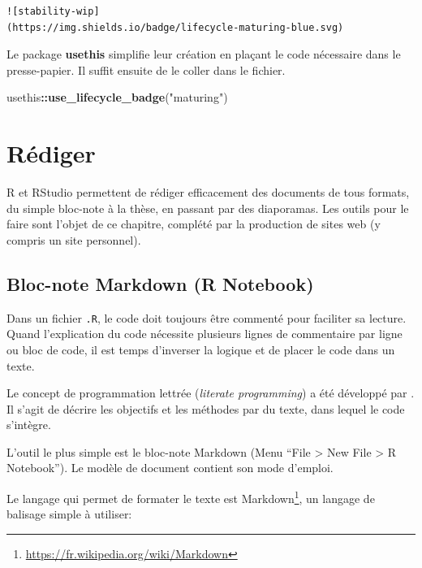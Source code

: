\documentclass[
  12pt,
  french,
  a4paper,
  extrafontsizes,onecolumn,openright
  ]{memoir}
\newenvironment{Shaded}{\begin{snugshade}}{\end{snugshade}}
\newcommand{\KeywordTok}[1]{\textcolor[rgb]{0.13,0.29,0.53}{\textbf{#1}}}
\newcommand{\NormalTok}[1]{#1}
\newcommand{\OperatorTok}[1]{\textcolor[rgb]{0.81,0.36,0.00}{\textbf{#1}}}
\newcommand{\StringTok}[1]{\textcolor[rgb]{0.31,0.60,0.02}{#1}}
\begin{document}
\begin{verbatim}
![stability-wip]
(https://img.shields.io/badge/lifecycle-maturing-blue.svg)
\end{verbatim}

Le package \textbf{usethis} simplifie leur création en plaçant le code nécessaire dans le presse-papier.
Il suffit ensuite de le coller dans le fichier.

\scriptsize

\begin{Shaded}
\begin{Highlighting}[]
\NormalTok{usethis}\OperatorTok{::}\KeywordTok{use_lifecycle_badge}\NormalTok{(}\StringTok{"maturing"}\NormalTok{)}
\end{Highlighting}
\end{Shaded}

\normalsize

\hypertarget{chap:rediger}{%
\chapter{Rédiger}\label{chap:rediger}}

R et RStudio permettent de rédiger efficacement des documents de tous formats, du simple bloc-note à la thèse, en passant par des diaporamas.
Les outils pour le faire sont l'objet de ce chapitre, complété par la production de sites web (y compris un site personnel).

\hypertarget{bloc-note-markdown-r-notebook}{%
\section{Bloc-note Markdown (R Notebook)}\label{bloc-note-markdown-r-notebook}}

Dans un fichier \texttt{.R}, le code doit toujours être commenté pour faciliter sa lecture.
Quand l'explication du code nécessite plusieurs lignes de commentaire par ligne ou bloc de code, il est temps d'inverser la logique et de placer le code dans un texte.

Le concept de programmation lettrée (\emph{literate programming}) a été développé par \textcite{Knuth1984}.
Il s'agit de décrire les objectifs et les méthodes par du texte, dans lequel le code s'intègre.

L'outil le plus simple est le bloc-note Markdown (Menu \enquote{File \textgreater{} New File \textgreater{} R Notebook}).
Le modèle de document contient son mode d'emploi.

Le langage qui permet de formater le texte est Markdown\footnote{\url{https://fr.wikipedia.org/wiki/Markdown}}, un langage de balisage simple à utiliser:
\end{document}
